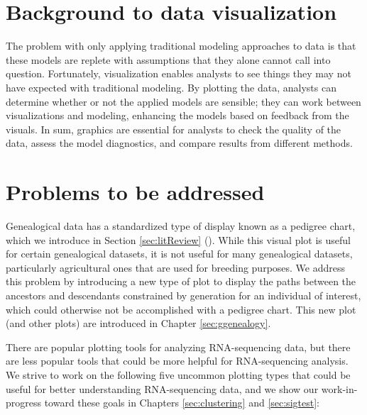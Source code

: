 \documentclass[11pt,a4paper,oldfontcommands,openany]{memoir}
\numberwithin{equation}{section} %
\begin{document}
\section{Background to data visualization}

The problem with only applying traditional modeling approaches to data is that these models are replete with assumptions that they alone cannot call into question. Fortunately, visualization enables analysts to see things they may not have expected with traditional modeling. By plotting the data, analysts can determine whether or not the applied models are sensible; they can work between visualizations and modeling, enhancing the models based on feedback from the visuals. In sum, graphics are essential for analysts to check the quality of the data, assess the model diagnostics, and compare results from different methods.

\section{Problems to be addressed}

Genealogical data has a standardized type of display known as a pedigree chart, which we introduce in Section \ref{sec:litReview} (\citealt{ped}). While this visual plot is useful for certain genealogical datasets, it is not useful for many genealogical datasets, particularly agricultural ones that are used for breeding purposes. We address this problem by introducing a new type of plot to display the paths between the ancestors and descendants constrained by generation for an individual of interest, which could otherwise not be accomplished with a pedigree chart. This new plot (and other plots) are introduced in Chapter \ref{sec:ggenealogy}.

There are popular plotting tools for analyzing RNA-sequencing data, but there are less popular tools that could be more helpful for RNA-sequencing analysis. We strive to work on the following five uncommon plotting types that could be useful for better understanding RNA-sequencing data, and we show our work-in-progress toward these goals in Chapters \ref{sec:clustering} and \ref{sec:sigtest}:

\clearpage
\end{document}
